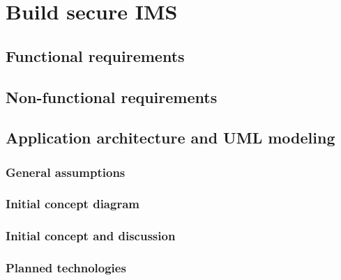 
\chapter{Build secure IMS}\label{ch:build-secure-ims}


\section{Functional requirements}\label{sec:functional-requirements}


\section{Non-functional requirements}\label{sec:non-functional-requirements}


\section{Application architecture and UML modeling}\label{sec:application-architecture-and-uml-modeling}

\subsection{General assumptions}\label{subsec:general-assumptions}

\subsection{Initial concept diagram}\label{subsec:initial-concept-diagram}

\subsection{Initial concept and discussion}\label{subsec:initial-concept-and-discussion}

\subsection{Planned technologies}\label{subsec:planned-technologies}